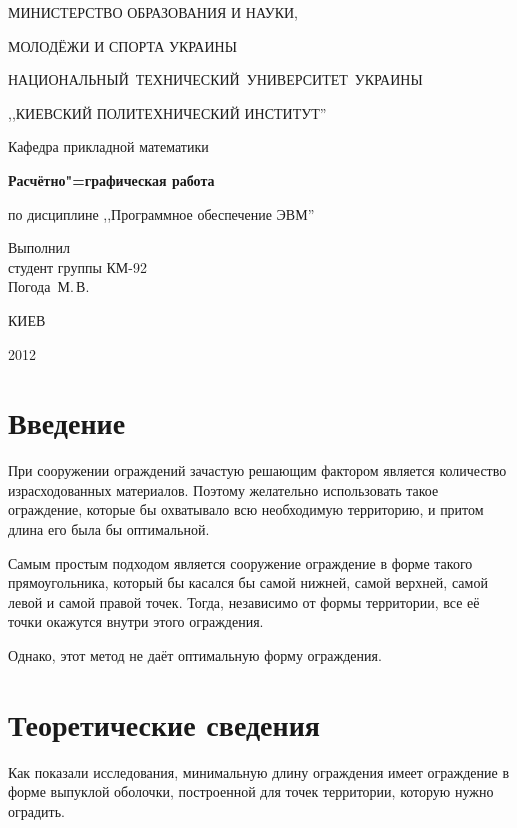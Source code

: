 \documentclass[a4paper,12pt,notitlepage,headsepline,pdftex]{scrartcl}
\begin{document}
\begin{titlepage}
  \begin{center}
    \large
    \MakeUppercase{Министерство образования и науки,}

    \MakeUppercase{молодёжи и спорта Украины}

    \mbox{\MakeUppercase{Национальный технический университет Украины}}

    \MakeUppercase{,,Киевский политехнический институт''}

    \addvspace{6pt}

    \normalsize
    Кафедра прикладной математики

    \vfill

    \textbf{Расчётно"=графическая работа}

    по дисциплине ,,Программное обеспечение ЭВМ''
  \end{center}

  \vfill

  \noindent
  Выполнил\\
  студент группы КМ-92\\
  Погода~М.\,В.\\
  \vfill

  \vfill

  \begin{center}
    КИЕВ

    2012
  \end{center}
\end{titlepage}
\tableofcontents
\newpage
\section{Введение}
  При сооружении ограждений зачастую решающим фактором является количество
  израсходованных материалов.
  Поэтому желательно использовать такое ограждение, которые бы охватывало всю
  необходимую территорию, и притом длина его была бы оптимальной.

  Самым простым подходом является сооружение ограждение в форме такого
  прямоугольника, который бы касался бы самой нижней, самой верхней, самой
  левой и самой правой точек.
  Тогда, независимо от формы территории, все её точки окажутся внутри этого
  ограждения.

  Однако, этот метод не даёт оптимальную форму ограждения.
  \newpage
\section{Теоретические сведения}
  Как показали исследования, минимальную длину ограждения имеет ограждение в
  форме выпуклой оболочки, построенной для точек территории, которую нужно
  оградить.\cite{book1}
\end{document}
